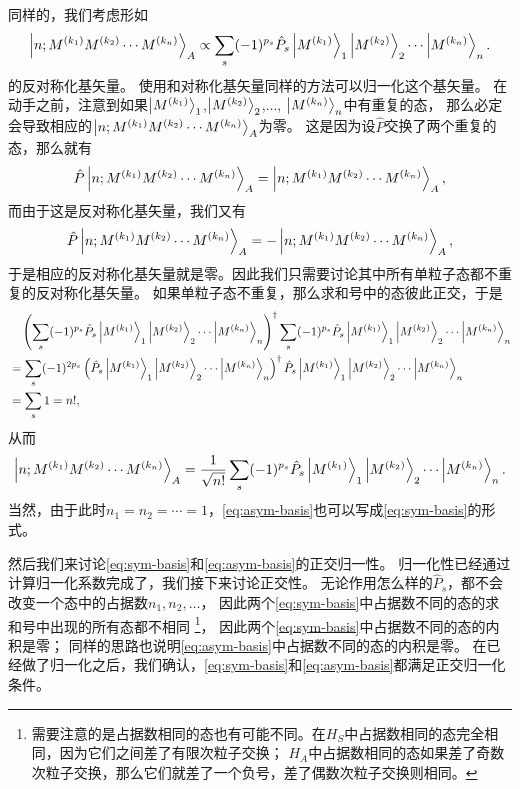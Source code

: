 \documentclass[UTF8, a4paper]{ctexart}
\begin{document}
同样的，我们考虑形如
\[
    \ket{n; M^{(k_1)} M^{(k_2)} \cdots M^{(k_n)}}_A \propto \sum_s (-1)^{p_s} \hat{P}_s \ket{M^{(k_1)}}_1 \ket{M^{(k_2)}}_2 \cdots \ket{M^{(k_n)}}_n.
\]
的反对称化基矢量。
使用和对称化基矢量同样的方法可以归一化这个基矢量。
在动手之前，注意到如果$\ket{M^{(k_1)}}_1$,$\ket{M^{(k_2)}}_2$,..., $\ket{M^{(k_n)}}_n$中有重复的态，
那么必定会导致相应的$\ket{n; M^{(k_1)} M^{(k_2)} \cdots M^{(k_n)}}_A$为零。
这是因为设$\hat{P}$交换了两个重复的态，那么就有
\[
    \hat{P} \ket{n; M^{(k_1)} M^{(k_2)} \cdots M^{(k_n)}}_A = \ket{n; M^{(k_1)} M^{(k_2)} \cdots M^{(k_n)}}_A,
\]
而由于这是反对称化基矢量，我们又有
\[
    \hat{P} \ket{n; M^{(k_1)} M^{(k_2)} \cdots M^{(k_n)}}_A = - \ket{n; M^{(k_1)} M^{(k_2)} \cdots M^{(k_n)}}_A,
\]
于是相应的反对称化基矢量就是零。因此我们只需要讨论其中所有单粒子态都不重复的反对称化基矢量。
如果单粒子态不重复，那么求和号中的态彼此正交，于是
\[
    \begin{aligned}
        &\quad \left(\sum_s (-1)^{p_s} \hat{P}_s \ket{M^{(k_1)}}_1 \ket{M^{(k_2)}}_2 \cdots \ket{M^{(k_n)}}_n\right)^\dagger \sum_s (-1)^{p_s} \hat{P}_s \ket{M^{(k_1)}}_1 \ket{M^{(k_2)}}_2 \cdots \ket{M^{(k_n)}}_n \\
        &= \sum_s (-1)^{2p_s} \left(\hat{P}_s \ket{M^{(k_1)}}_1 \ket{M^{(k_2)}}_2 \cdots \ket{M^{(k_n)}}_n\right)^\dagger \hat{P}_s \ket{M^{(k_1)}}_1 \ket{M^{(k_2)}}_2 \cdots \ket{M^{(k_n)}}_n \\
        &= \sum_s 1 = n!,
    \end{aligned}
\]
从而
\begin{equation}
    \ket{n; M^{(k_1)} M^{(k_2)} \cdots M^{(k_n)}}_A 
    = \frac{1}{\sqrt{n!}} \sum_s (-1)^{p_s} \hat{P}_s \ket{M^{(k_1)}}_1 \ket{M^{(k_2)}}_2 \cdots \ket{M^{(k_n)}}_n.
    \label{eq:asym-basis}
\end{equation}
当然，由于此时$n_1 = n_2 = \cdots = 1$，\eqref{eq:asym-basis}也可以写成\eqref{eq:sym-basis}的形式。

然后我们来讨论\eqref{eq:sym-basis}和\eqref{eq:asym-basis}的正交归一性。
归一化性已经通过计算归一化系数完成了，我们接下来讨论正交性。
无论作用怎么样的$\hat{P}_s$，都不会改变一个态中的占据数$n_1, n_2, \ldots$，
因此两个\eqref{eq:sym-basis}中占据数不同的态的求和号中出现的所有态都不相同%
\footnote{需要注意的是占据数相同的态也有可能不同。在$H_S$中占据数相同的态完全相同，因为它们之间差了有限次粒子交换；
$H_A$中占据数相同的态如果差了奇数次粒子交换，那么它们就差了一个负号，差了偶数次粒子交换则相同。}，
因此两个\eqref{eq:sym-basis}中占据数不同的态的内积是零；
同样的思路也说明\eqref{eq:asym-basis}中占据数不同的态的内积是零。
在已经做了归一化之后，我们确认，\eqref{eq:sym-basis}和\eqref{eq:asym-basis}都满足正交归一化条件。
\end{document}
